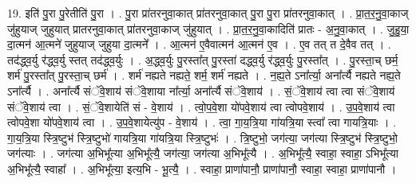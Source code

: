 \documentclass[17pt]{extarticle}
\begin{document}
19. इति॑ पु॒रा पु॒रेतीति॑ पु॒रा । . पु॒रा प्रा॑तरनुवा॒कात् प्रा॑तरनुवा॒कात् पु॒रा पु॒रा प्रा॑तरनुवा॒कात् । . प्रा॒त॒र॒नु॒वा॒काज् जु॑हुयाज् जुहुयात् प्रातरनुवा॒कात् प्रा॑तरनुवा॒काज् जु॑हुयात् । . प्रा॒त॒र॒नु॒वा॒कादिति॑ प्रातः - अ॒नु॒वा॒कात् । . जु॒हु॒या॒ दा॒त्मन॑ आ॒त्मने॑ जुहुयाज् जुहुया दा॒त्मने᳚ । . आ॒त्मन॑ ए॒वैवात्मन॑ आ॒त्मन॑ ए॒व । . ए॒व तत् त दे॒वैव तत् । . तद॑द्ध्व॒र्यु र॑द्ध्व॒र्यु स्तत् तद॑द्ध्व॒र्युः । . अ॒द्ध्व॒र्युः पु॒रस्ता᳚त् पु॒रस्ता॑ दद्ध्व॒र्यु र॑द्ध्व॒र्युः पु॒रस्ता᳚त् । . पु॒रस्ता॒च् छर्म॒ शर्म॑ पु॒रस्ता᳚त् पु॒रस्ता॒च् छर्म॑ । . शर्म॑ नह्यते नह्यते॒ शर्म॒ शर्म॑ नह्यते । . न॒ह्य॒ते ऽना᳚र्त्या॒ अना᳚र्त्यै नह्यते नह्य॒ते ऽना᳚र्त्यै । . अना᳚र्त्यै संॅवे॒शाय॑ संॅवे॒शाया ना᳚र्त्या॒ अना᳚र्त्यै संॅवे॒शाय॑ । . सं॒ॅवे॒शाय॑ त्वा त्वा संॅवे॒शाय॑ संॅवे॒शाय॑ त्वा । . सं॒ॅवे॒शायेति॑ सं - वे॒शाय॑ । . त्वो॒प॒वे॒शा यो॑पवे॒शाय॑ त्वा त्वोपवे॒शाय॑ । . उ॒प॒वे॒शाय॑ त्वा त्वोपवे॒शा यो॑पवे॒शाय॑ त्वा । . उ॒प॒वे॒शायेत्यु॑प - वे॒शाय॑ । . त्वा॒ गा॒य॒त्रि॒या गा॑यत्रि॒या स्त्वा᳚ त्वा गायत्रि॒याः । . गा॒य॒त्रि॒या स्त्रि॒ष्टुभ॑ स्त्रि॒ष्टुभो॑ गायत्रि॒या गा॑यत्रि॒या स्त्रि॒ष्टुभः॑ । . त्रि॒ष्टुभो॒ जग॑त्या॒ जग॑त्या स्त्रि॒ष्टुभ॑ स्त्रि॒ष्टुभो॒ जग॑त्याः । . जग॑त्या अ॒भिभू᳚त्या अ॒भिभू᳚त्यै॒ जग॑त्या॒ जग॑त्या अ॒भिभू᳚त्यै । . अ॒भिभू᳚त्यै॒ स्वाहा॒ स्वाहा॒ ऽभिभू᳚त्या अ॒भिभू᳚त्यै॒ स्वाहा᳚ । . अ॒भिभू᳚त्या॒ इत्य॒भि - भू॒त्यै॒ । . स्वाहा॒ प्राणा॑पानौ॒ प्राणा॑पानौ॒ स्वाहा॒ स्वाहा॒ प्राणा॑पानौ । \newline
\end{document}
